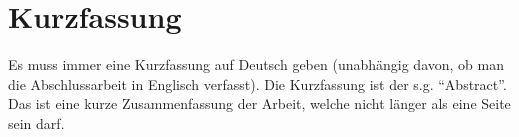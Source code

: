 \chapter*{Kurzfassung}

Es muss immer eine Kurzfassung auf Deutsch geben (unabh\"angig davon, ob man die Abschlussarbeit in Englisch verfasst).
Die Kurzfassung ist der s.g. ``Abstract''. 
Das ist eine kurze Zusammenfassung der Arbeit, welche nicht l\"anger als eine Seite sein darf.
